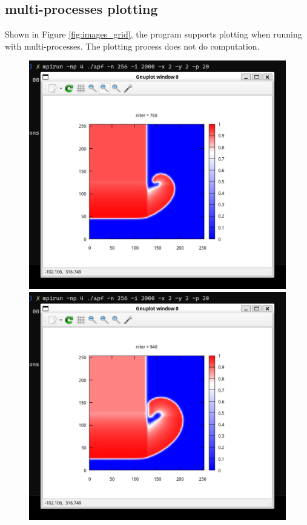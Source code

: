 \documentclass[12pt]{article}
\begin{document}
\subsection{multi-processes plotting}
Shown in Figure \ref{fig:images_grid}, 
the program supports plotting when running with multi-processes.
The plotting process does not do computation. 

\begin{figure}[h]
    \centering
    \begin{minipage}[b]{0.45\textwidth}
        \centering
        \includegraphics[width=\textwidth]{img/1.png}
    \end{minipage}
    \hfill
    \begin{minipage}[b]{0.45\textwidth}
        \centering
        \includegraphics[width=\textwidth]{img/2.png}

\end{minipage}
\end{figure}
\end{document}
